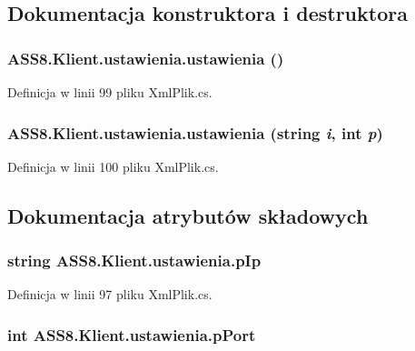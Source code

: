 \subsection{Dokumentacja konstruktora i destruktora}
\hypertarget{a00028_f1bd27e0477ee60679903f8da05880f6}{
\subsubsection[{ustawienia}]{\setlength{\rightskip}{0pt plus 5cm}ASS8.Klient.ustawienia.ustawienia ()}}
\label{dc/d3c/a00028_f1bd27e0477ee60679903f8da05880f6}




Definicja w linii 99 pliku XmlPlik.cs.\hypertarget{a00028_a106e294dcbaf3f6ee35391245e2cfbe}{
\subsubsection[{ustawienia}]{\setlength{\rightskip}{0pt plus 5cm}ASS8.Klient.ustawienia.ustawienia (string {\em i}, \/  int {\em p})}}
\label{dc/d3c/a00028_a106e294dcbaf3f6ee35391245e2cfbe}




Definicja w linii 100 pliku XmlPlik.cs.

\subsection{Dokumentacja atrybutów składowych}
\hypertarget{a00028_7e640b9285f7ac1b34b50b95193e3db6}{
\subsubsection[{pIp}]{\setlength{\rightskip}{0pt plus 5cm}string {\bf ASS8.Klient.ustawienia.pIp}}}
\label{dc/d3c/a00028_7e640b9285f7ac1b34b50b95193e3db6}




Definicja w linii 97 pliku XmlPlik.cs.\hypertarget{a00028_77ec7b173849fa53b9230b15d7d1b9f8}{
\subsubsection[{pPort}]{\setlength{\rightskip}{0pt plus 5cm}int {\bf ASS8.Klient.ustawienia.pPort}}}
\label{dc/d3c/a00028_77ec7b173849fa53b9230b15d7d1b9f8}




